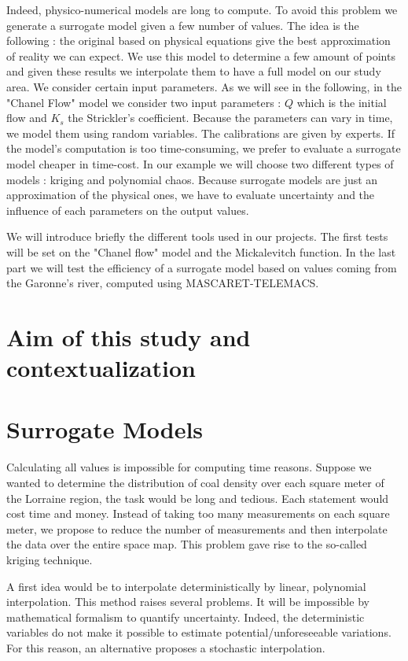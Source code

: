 \documentclass[hidelinks,12pt]{article}
\begin{document}
Indeed, physico-numerical models are long to compute. To avoid this problem we generate a surrogate model given a few number of values. The idea is the following : the original based on physical equations give the best approximation of reality we can expect. We use this model to determine a few amount of points and given these results we interpolate them to have a full model on our study area. 
We consider certain input parameters. As we will see in the following, in the "Chanel Flow" model we consider two input parameters : $Q$ which is the initial flow and $K_s$ the Strickler's coefficient. Because the parameters can vary in time, we model them using random variables. The calibrations are given by experts. 
If the model's computation is too time-consuming, we prefer to evaluate a surrogate model cheaper in time-cost. In our example we will choose two different types of models : kriging and polynomial chaos. Because surrogate models are just an approximation of the physical ones, we have to evaluate uncertainty and the influence of each parameters on the output values.

We will introduce briefly the different tools used in our projects. The first tests will be set on the "Chanel flow" model and the Mickalevitch function. In the last part we will test the efficiency of a surrogate model based on values coming from the Garonne's river, computed using MASCARET-TELEMACS.




\section{Aim of this study and contextualization}

\section{Surrogate Models}

Calculating all values is impossible for computing time reasons. Suppose we wanted to determine the distribution of coal density over each square meter of the Lorraine region, the task would be long and tedious. Each statement would cost time and money. Instead of taking too many measurements on each square meter, we propose to reduce the number of measurements and then interpolate the data over the entire space map. This problem gave rise to the so-called kriging technique.

A first idea would be to interpolate deterministically by linear, polynomial interpolation. This method raises several problems. It will be impossible by mathematical formalism to quantify uncertainty. Indeed, the deterministic variables do not make it possible to estimate potential/unforeseeable variations. For this reason, an alternative proposes a stochastic interpolation.
\end{document}
